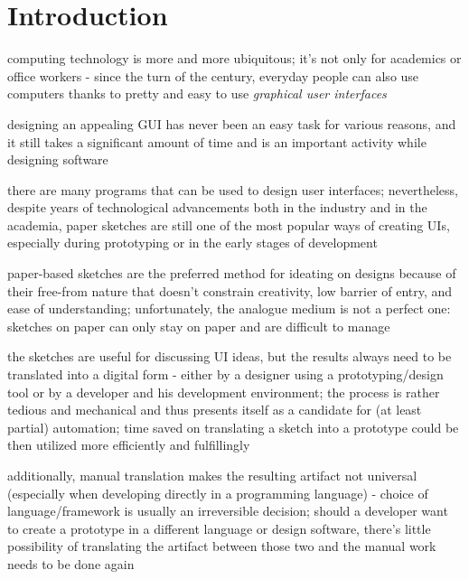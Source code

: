 \section{Introduction}\label{sec:introduction}


computing technology is more and more ubiquitous; it's not only for academics
or office workers - since the turn of the century, everyday people can also use
computers thanks to pretty and easy to use
\emph{graphical user interfaces} 

designing an appealing GUI has never been an easy task for various reasons,
and it still takes a significant amount of time 
and is an important activity while designing software

there are many programs that can be used to design user interfaces;
nevertheless, despite years of technological advancements
both in the industry and in the academia, paper sketches are still
one of the most popular  ways of creating UIs, especially during prototyping
or in the early stages of development

paper-based sketches are the preferred method for ideating on designs
because of their free-from nature that doesn't constrain creativity,
low barrier of entry, and ease of understanding;
unfortunately, the analogue medium is not a perfect one: sketches on paper
can only stay on paper and are difficult to manage 

the sketches are useful for discussing UI ideas, but the results
always need to be translated into a digital form - either by a designer using a prototyping/design tool or by a developer and his development environment;
the process is rather tedious and mechanical  and thus presents itself
as a candidate for (at least partial) automation;
time saved on translating a sketch into a prototype
could be then utilized more efficiently and fulfillingly

additionally, manual translation makes the resulting artifact not universal
(especially when developing directly in a programming language)
- choice of language/framework is usually an irreversible decision;
should a developer want to create a prototype in a different language
or design software, there's little possibility of translating the artifact
between those two and the manual work needs to be done again

